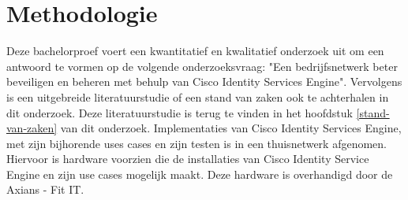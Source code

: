 
\chapter{Methodologie}
\label{ch:methodologie}


Deze bachelorproef voert een kwantitatief en kwalitatief onderzoek uit om een antwoord te vormen op de volgende onderzoeksvraag: "Een bedrijfsnetwerk beter beveiligen en beheren met behulp van Cisco Identity Services Engine". 
\newline
\newline
Vervolgens is een uitgebreide literatuurstudie of een stand van zaken ook te achterhalen in dit onderzoek. Deze literatuurstudie is terug te vinden in het hoofdstuk \ref{stand-van-zaken} van dit onderzoek. Implementaties van Cisco Identity Services Engine, met zijn bijhorende uses cases en zijn testen is in een thuisnetwerk afgenomen. Hiervoor is hardware voorzien die de installaties van Cisco Identity Service Engine en zijn use cases mogelijk maakt. Deze hardware is overhandigd door de Axians - Fit IT.
\newline
\newline
